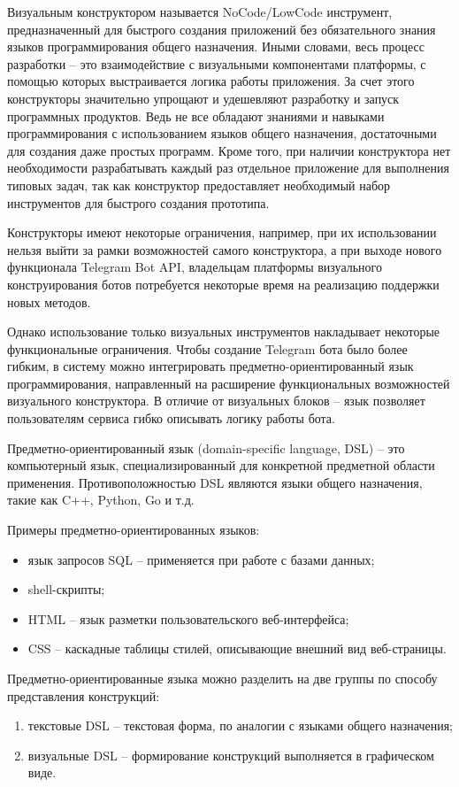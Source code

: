 Визуальным конструктором называется NoCode/LowCode инструмент,
предназначенный для быстрого создания приложений без обязательного знания языков программирования общего назначения.
Иными словами, весь процесс разработки -- это взаимодействие с визуальными компонентами платформы,
с помощью которых выстраивается логика работы приложения.
За счет этого конструкторы значительно упрощают и удешевляют разработку и запуск программных продуктов.
Ведь не все обладают знаниями и навыками программирования с использованием языков общего назначения, достаточными для создания даже простых программ.
Кроме того, при наличии конструктора нет необходимости разрабатывать каждый раз отдельное приложение для выполнения типовых задач,
так как конструктор предоставляет необходимый набор инструментов для быстрого создания прототипа.

Конструкторы имеют некоторые ограничения, например, при их использовании нельзя выйти за рамки возможностей самого конструктора,
а при выходе нового функционала Telegram Bot API,
владельцам платформы визуального конструирования ботов потребуется некоторые время на реализацию поддержки новых методов.

Однако использование только визуальных инструментов накладывает некоторые функциональные ограничения.
Чтобы создание Telegram бота было более гибким, в систему можно интегрировать предметно-ориентированный язык программирования,
направленный на расширение функциональных возможностей визуального конструктора.
В отличие от визуальных блоков – язык позволяет пользователям сервиса гибко описывать логику работы бота.

Предметно-ориентированный язык (domain-specific language, DSL) -- это компьютерный язык, специализированный для конкретной предметной области применения.
Противоположностью DSL являются языки общего назначения, такие как C++, Python, Go и т.д.

Примеры предметно-ориентированных языков:
\begin{itemize}
    \item язык запросов SQL -- применяется при работе с базами данных;
    \item shell-скрипты;
    \item HTML -- язык разметки пользовательского веб-интерфейса;
    \item CSS -- каскадные таблицы стилей, описывающие внешний вид веб-страницы.
\end{itemize}

Предметно-ориентированные языка можно разделить на две группы по способу представления конструкций:
\begin{enumerate}
    \item текстовые DSL -- текстовая форма, по аналогии с языками общего назначения;
    \item визуальные DSL -- формирование конструкций выполняется в графическом виде.
\end{enumerate}

